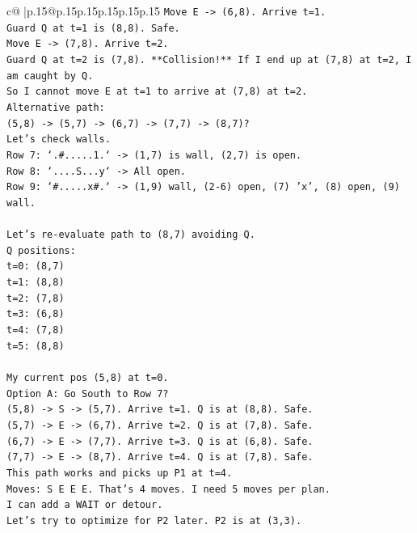 \documentclass{article}
\begin{document}
{\begin{supertabular}{c@{$\;$}|p{.15\linewidth}@{}p{.15\linewidth}p{.15\linewidth}p{.15\linewidth}p{.15\linewidth}p{.15\linewidth}}
{{{\texttt{Move E {-}> (6,8). Arrive t=1.} \\
\texttt{Guard Q at t=1 is (8,8). Safe.} \\
\texttt{Move E {-}> (7,8). Arrive t=2.} \\
\texttt{Guard Q at t=2 is (7,8). **Collision!** If I end up at (7,8) at t=2, I am caught by Q.} \\
\texttt{So I cannot move E at t=1 to arrive at (7,8) at t=2.} \\
\texttt{Alternative path:} \\
\texttt{(5,8) {-}> (5,7) {-}> (6,7) {-}> (7,7) {-}> (8,7)?} \\
\texttt{Let's check walls.} \\
\texttt{Row 7: `.\#.....1.` {-}> (1,7) is wall, (2,7) is open.} \\
\texttt{Row 8: `....S...y` {-}> All open.} \\
\texttt{Row 9: `\#.....x\#.` {-}> (1,9) wall, (2{-}6) open, (7) 'x', (8) open, (9) wall.} \\
\\ 
\texttt{Let's re{-}evaluate path to (8,7) avoiding Q.} \\
\texttt{Q positions:} \\
\texttt{t=0: (8,7)} \\
\texttt{t=1: (8,8)} \\
\texttt{t=2: (7,8)} \\
\texttt{t=3: (6,8)} \\
\texttt{t=4: (7,8)} \\
\texttt{t=5: (8,8)} \\
\\ 
\texttt{My current pos (5,8) at t=0.} \\
\texttt{Option A: Go South to Row 7?} \\
\texttt{(5,8) {-}> S {-}> (5,7). Arrive t=1. Q is at (8,8). Safe.} \\
\texttt{(5,7) {-}> E {-}> (6,7). Arrive t=2. Q is at (7,8). Safe.} \\
\texttt{(6,7) {-}> E {-}> (7,7). Arrive t=3. Q is at (6,8). Safe.} \\
\texttt{(7,7) {-}> E {-}> (8,7). Arrive t=4. Q is at (7,8). Safe.} \\
\texttt{This path works and picks up P1 at t=4.} \\
\texttt{Moves: S E E E. That's 4 moves. I need 5 moves per plan.} \\
\texttt{I can add a WAIT or detour.} \\
\texttt{Let's try to optimize for P2 later. P2 is at (3,3).} \\
}}}
\end{supertabular}}
\end{document}
